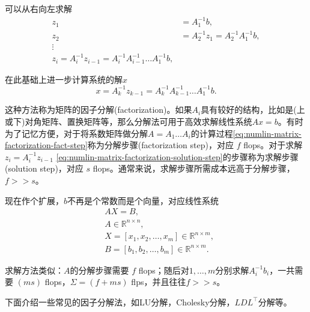 可以从右向左求解
\begin{equation}
\label{eq:numlin-matrix-factorization-solution-step}
\begin{split}
    z_{1} & = A_{1}^{-1} b, \\
    z_{2} & = A_{2}^{-1} z_{1} = A_{2}^{-1} A_{1}^{-1} b, \\
    \vdots & \\
    z_{i} = A_{i}^{-1} z_{i-1} = A_{i}^{-1} A_{i-1}^{-1} \ldots A_{1}^{-1} b,
\end{split}
\end{equation}

在此基础上进一步计算系统的解$x$
\begin{equation*}
  x = A_{k}^{-1} z_{k-1} = A_{k}^{-1} A_{k-1}^{-1} \ldots A_{1}^{-1} b.
\end{equation*}

这种方法称为矩阵的因子分解(factorization)。如果$A_{i}$具有较好的结构，比如是(上或下)对角矩阵、置换矩阵等，那么分解法可用于高效求解线性系统$A x = b$。有时为了记忆方便，对于将系数矩阵做分解$A=A_{1} \ldots A_{i}$的计算过程\eqref{eq:numlin-matrix-factorization-fact-step}称为分解步骤(factorization step)，对应 $f$ flops。对于求解$z_{i} = A_{i}^{-1} z_{i-1}$ \eqref{eq:numlin-matrix-factorization-solution-step}的步骤称为求解步骤(solution step)，对应 $s$ flops。通常来说，求解步骤所需成本远高于分解步骤，$f >> s$。

现在作个扩展，$b$不再是个常数而是个向量，对应线性系统
\begin{equation*}
\begin{split}
  & A X = B,  \\
  & A \in \mathbb{R}^{n \times n}, \\
  & X = \left[ x_{1}, x_{2}, \ldots, x_{m} \right] \in \mathbb{R}^{ n \times m}, \\
  & B = \left[ b_{1}, b_{2}, \ldots, b_{m} \right] \in \mathbb{R}^{ n \times m}.
\end{split}
\end{equation*}

求解方法类似：$A$的分解步骤需要 $f$ flops；随后对$1,\ldots,m$分别求解$A_{i}^{-1} b_{i}$，一共需要 $(m s)$ flops，$\Sigma = \left( f + ms \right)$ flps，并且往往$f >> s$。

下面介绍一些常见的因子分解法，如LU分解，Cholesky分解，$LDL^{\top}$分解等。

